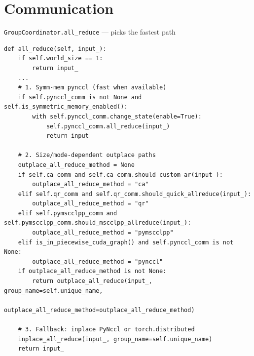 \documentclass[aspectratio=169,10pt]{beamer}
\begin{document}
\section{Communication}

\begin{frame}[fragile]{\texttt{GroupCoordinator.all\_reduce} --- picks the fastest path}
  \footnotesize
\begin{lstlisting}
def all_reduce(self, input_):
    if self.world_size == 1:
        return input_
    ...
    # 1. Symm-mem pynccl (fast when available)
    if self.pynccl_comm is not None and self.is_symmetric_memory_enabled():
        with self.pynccl_comm.change_state(enable=True):
            self.pynccl_comm.all_reduce(input_)
            return input_

    # 2. Size/mode-dependent outplace paths
    outplace_all_reduce_method = None
    if self.ca_comm and self.ca_comm.should_custom_ar(input_):
        outplace_all_reduce_method = "ca"
    elif self.qr_comm and self.qr_comm.should_quick_allreduce(input_):
        outplace_all_reduce_method = "qr"
    elif self.pymscclpp_comm and self.pymscclpp_comm.should_mscclpp_allreduce(input_):
        outplace_all_reduce_method = "pymscclpp"
    elif is_in_piecewise_cuda_graph() and self.pynccl_comm is not None:
        outplace_all_reduce_method = "pynccl"
    if outplace_all_reduce_method is not None:
        return outplace_all_reduce(input_, group_name=self.unique_name,
                                   outplace_all_reduce_method=outplace_all_reduce_method)

    # 3. Fallback: inplace PyNccl or torch.distributed
    inplace_all_reduce(input_, group_name=self.unique_name)
    return input_
\end{lstlisting}
\end{frame}
\end{document}

